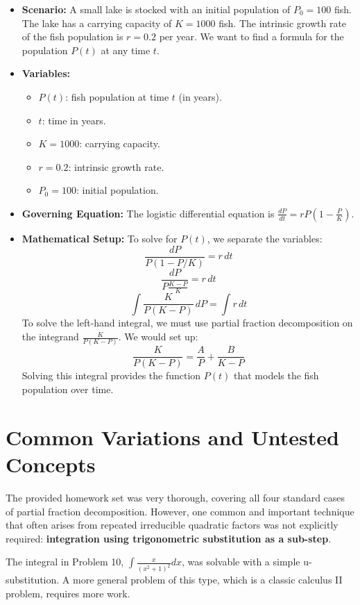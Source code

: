 \documentclass{article}
\begin{document}
\begin{itemize}
    \item \textbf{Scenario:} A small lake is stocked with an initial population of $P_0 = 100$ fish. The lake has a carrying capacity of $K=1000$ fish. The intrinsic growth rate of the fish population is $r=0.2$ per year. We want to find a formula for the population $P(t)$ at any time $t$.
    \item \textbf{Variables:}
    \begin{itemize}
        \item $P(t)$: fish population at time $t$ (in years).
        \item $t$: time in years.
        \item $K = 1000$: carrying capacity.
        \item $r = 0.2$: intrinsic growth rate.
        \item $P_0 = 100$: initial population.
    \end{itemize}
    \item \textbf{Governing Equation:} The logistic differential equation is $\displaystyle \frac{dP}{dt} = rP\left(1 - \frac{P}{K}\right)$.
    \item \textbf{Mathematical Setup:} To solve for $P(t)$, we separate the variables:
    \[ \frac{dP}{P(1 - P/K)} = r \,dt \]
    \[ \frac{dP}{P\frac{K-P}{K}} = r \,dt \]
    \[ \int \frac{K}{P(K-P)} \,dP = \int r \,dt \]
    To solve the left-hand integral, we must use partial fraction decomposition on the integrand $\frac{K}{P(K-P)}$. We would set up:
    \[ \frac{K}{P(K-P)} = \frac{A}{P} + \frac{B}{K-P} \]
    Solving this integral provides the function $P(t)$ that models the fish population over time.
\end{itemize}

\part{Common Variations and Untested Concepts}
The provided homework set was very thorough, covering all four standard cases of partial fraction decomposition. However, one common and important technique that often arises from repeated irreducible quadratic factors was not explicitly required: \textbf{integration using trigonometric substitution as a sub-step}.

The integral in Problem 10, $\int \frac{x}{(x^2+1)^2} dx$, was solvable with a simple u-substitution. A more general problem of this type, which is a classic calculus II problem, requires more work.
\end{document}
